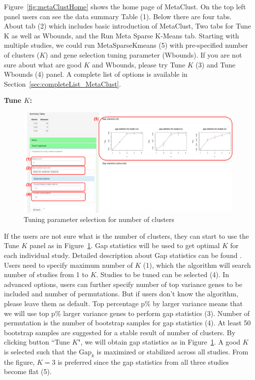 Figure~\ref{fig:metaClustHome} shows the home page of MetaClust.
On the top left panel users can see the data summary Table {\color{red} (1)}.
Below there are four tabs. 
About tab {\color{red} (2)} which includes basic introduction of MetaClust, Two tabs for Tune K as well as Wbounds, and the Run Meta Sparse K-Means tab.
Starting with multiple studies, 
we could run MetaSparseKmeans {\color{red} (5)} with pre-specified number of clusters ($K$) and gene selection tuning parameter (Wbounds).
If you are not sure about what are good $K$ and Wbounds, please try Tune $K$ {\color{red} (3)} and Tune Wbounds {\color{red} (4)} panel.
A complete list of options is available in Section~\ref{sec:completeList_MetaClust}.

\begin{steps}

\item \textbf{Tune $K$:} 

\begin{figure}[H]
\begin{center}
\includegraphics[scale=0.5]{./figure/metaClust/tuneK.pdf}
\caption{Tuning parameter selection for number of clusters}
\label{fig:metaClusttuneK}
\end{center}
\end{figure}

If the users are not sure what is the number of clusters,
they can start to use the Tune $K$ panel as in Figure~\ref{fig:metaClusttuneK}.
Gap statistics will be used to get optimal $K$ for each individual study.
Detailed description about Gap statistics can be found \cite{tibshirani2001estimating}.
Users need to specify maximum number of $K$ {\color{red} (1)}, which the algorithm will search number of studies from 1 to $K$.
Studies to be tuned can be selected {\color{red} (4)}.
In advanced options, users can further specify number of top variance genes to be included and number of permutations.
But if users don't know the algorithm, please leave them as default.
Top percentage p\% by larger variance means that we will use top p\% larger variance genes to perform gap statistics {\color{red} (3)}.
Number of permutation is the number of bootstrap samples for gap statistics {\color{red} (4)}.
At least 50 bootstrap samples are suggested for a stable result of number of clusters.
By clicking button ``Tune $K$",
we will obtain gap statistics as in Figure~\ref{fig:metaClusttuneK}.
A good $K$ is selected such that the $\mbox{Gap}_k$ is maximized or stabilized across all studies.
From the figure, $K=3$ is preferred since the gap statistics from all three studies become flat {\color{red} (5)}.


\end{steps}
